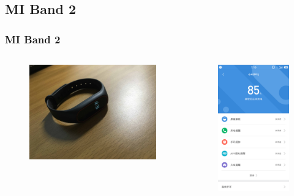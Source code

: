 \documentclass[UTF8]{ctexbeamer}
\begin{document}
\subsection{MI Band 2}

\begin{frame}
  \frametitle{MI Band 2}
  \begin{columns}
  \begin{figure}
    \includegraphics[width=0.9\linewidth]{mi-band-2.jpg}
  \end{figure}
  \begin{figure}
    \includegraphics[width=0.6\linewidth]{mi-fit.png}
  \end{figure}
  \end{columns}
\end{frame}
\end{document}
